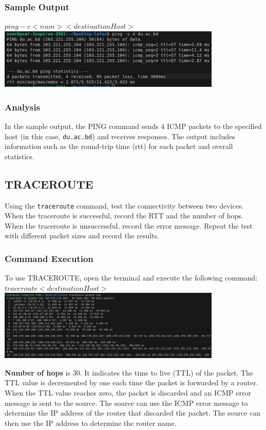 \documentclass[12pt]{article}
\begin{document}
\subsubsection*{Sample Output}
$
ping -c <num> <destinationHost>
$
\includegraphics[width=0.8\textwidth]{pingCount.png}\par\vspace{1cm}

\subsubsection*{Analysis}
In the sample output, the PING command sends 4 ICMP packets to the specified host (in this case, \texttt{du.ac.bd}) and receives responses. The output includes information such as the round-trip time (rtt) for each packet and overall statistics.


\subsection{TRACEROUTE}
Using the {
    \texttt{traceroute}
} command, test the connectivity between two devices. When the traceroute is successful, record the RTT and the number of hops. When the traceroute is unsuccessful, record the error message. Repeat the test with different packet sizes and record the results.

\subsubsection*{Command Execution}
To use TRACEROUTE, open the terminal and execute the following command:
$traceroute <destinationHost>$
\includegraphics[width=0.8\textwidth]{traceroute.png}\par\vspace{1cm}
{\textbf{Number of hops}} is 30. It indicates the time to live (TTL) of the packet. The TTL value is decremented by one each time the packet is forwarded by a router. When the TTL value reaches zero, the packet is discarded and an ICMP error message is sent to the source. The source can use the ICMP error message to determine the IP address of the router that discarded the packet. The source can then use the IP address to determine the router name.
\end{document}
